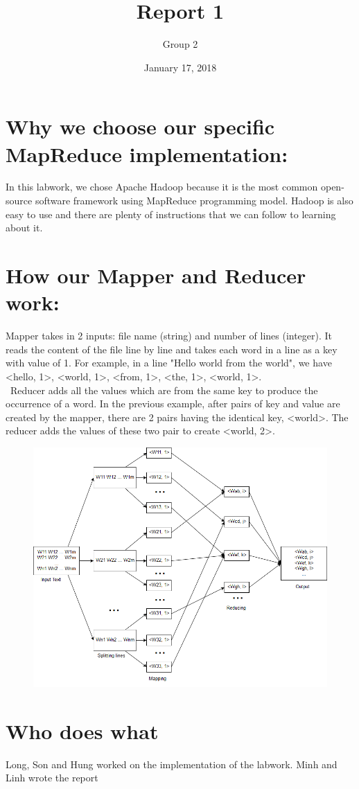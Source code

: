 \documentclass[12pt]{article}
\title{Report 1}
\author{Group 2}
\date{January 17, 2018}
\begin{document}
\maketitle
  \section{Why we choose our specific MapReduce implementation:}
    In this labwork, we chose Apache Hadoop because it is the most common open-source software framework using MapReduce programming model. Hadoop is also easy to use and there are plenty of instructions that we can follow to learning about it. 
  
  \section{How our Mapper and Reducer work:}
    Mapper takes in 2 inputs: file name (string) and number of lines (integer). It reads the content of the file line by line and takes each word in a line as a key with value of 1. For example, in a line "Hello world from the world", we have <hello, 1>, <world, 1>, <from, 1>, <the, 1>, <world, 1>. \\\
    Reducer adds all the values which are from the same key to produce the occurrence of a word. In the previous example, after pairs of key and value are created by the mapper, there are 2 pairs having the identical key, <world>. The reducer adds the values of these two pair to create <world, 2>.
    \begin{figure}[h]
      \centering
      \includegraphics{WordCounter.png}
    \end{figure}

    \section{Who does what}
    Long, Son and Hung worked on the implementation of the labwork. Minh and Linh wrote the report
\end{document}

